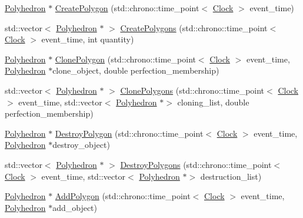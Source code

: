 \begin{DoxyCompactItemize}
\mbox{\hyperlink{class_polyhedron}{Polyhedron}} $\ast$ \mbox{\hyperlink{class_polyhedron_ae5852dd26065d9f38ed293f8d95106ad}{Create\+Polygon}} (std\+::chrono\+::time\+\_\+point$<$ \mbox{\hyperlink{universe_8h_a0ef8d951d1ca5ab3cfaf7ab4c7a6fd80}{Clock}} $>$ event\+\_\+time)
\item 
std\+::vector$<$ \mbox{\hyperlink{class_polyhedron}{Polyhedron}} $\ast$ $>$ \mbox{\hyperlink{class_polyhedron_a1848eb8747c1132c40c2d27336af2896}{Create\+Polygons}} (std\+::chrono\+::time\+\_\+point$<$ \mbox{\hyperlink{universe_8h_a0ef8d951d1ca5ab3cfaf7ab4c7a6fd80}{Clock}} $>$ event\+\_\+time, int quantity)
\item 
\mbox{\hyperlink{class_polyhedron}{Polyhedron}} $\ast$ \mbox{\hyperlink{class_polyhedron_abfacad3a348785dab8819e70bf92d8d1}{Clone\+Polygon}} (std\+::chrono\+::time\+\_\+point$<$ \mbox{\hyperlink{universe_8h_a0ef8d951d1ca5ab3cfaf7ab4c7a6fd80}{Clock}} $>$ event\+\_\+time, \mbox{\hyperlink{class_polyhedron}{Polyhedron}} $\ast$clone\+\_\+object, double perfection\+\_\+membership)
\item 
std\+::vector$<$ \mbox{\hyperlink{class_polyhedron}{Polyhedron}} $\ast$ $>$ \mbox{\hyperlink{class_polyhedron_ab4f57da9595dc92de7340cc46237a2ea}{Clone\+Polygons}} (std\+::chrono\+::time\+\_\+point$<$ \mbox{\hyperlink{universe_8h_a0ef8d951d1ca5ab3cfaf7ab4c7a6fd80}{Clock}} $>$ event\+\_\+time, std\+::vector$<$ \mbox{\hyperlink{class_polyhedron}{Polyhedron}} $\ast$$>$ cloning\+\_\+list, double perfection\+\_\+membership)
\item 
\mbox{\hyperlink{class_polyhedron}{Polyhedron}} $\ast$ \mbox{\hyperlink{class_polyhedron_a2fcc5144ebc64363f40c31d2b980cfaf}{Destroy\+Polygon}} (std\+::chrono\+::time\+\_\+point$<$ \mbox{\hyperlink{universe_8h_a0ef8d951d1ca5ab3cfaf7ab4c7a6fd80}{Clock}} $>$ event\+\_\+time, \mbox{\hyperlink{class_polyhedron}{Polyhedron}} $\ast$destroy\+\_\+object)
\item 
std\+::vector$<$ \mbox{\hyperlink{class_polyhedron}{Polyhedron}} $\ast$ $>$ \mbox{\hyperlink{class_polyhedron_ae372d216765d48b9423ee37a8bf8b282}{Destroy\+Polygons}} (std\+::chrono\+::time\+\_\+point$<$ \mbox{\hyperlink{universe_8h_a0ef8d951d1ca5ab3cfaf7ab4c7a6fd80}{Clock}} $>$ event\+\_\+time, std\+::vector$<$ \mbox{\hyperlink{class_polyhedron}{Polyhedron}} $\ast$$>$ destruction\+\_\+list)
\item 
\mbox{\hyperlink{class_polyhedron}{Polyhedron}} $\ast$ \mbox{\hyperlink{class_polyhedron_a63bc509a87935cc25e541d2490c01d1f}{Add\+Polygon}} (std\+::chrono\+::time\+\_\+point$<$ \mbox{\hyperlink{universe_8h_a0ef8d951d1ca5ab3cfaf7ab4c7a6fd80}{Clock}} $>$ event\+\_\+time, \mbox{\hyperlink{class_polyhedron}{Polyhedron}} $\ast$add\+\_\+object)

\end{DoxyCompactItemize}
